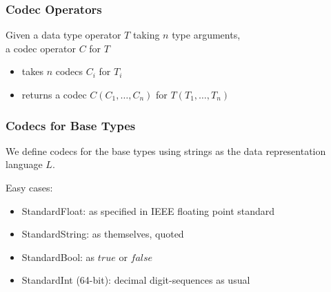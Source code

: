 \begin{frame}\frametitle{Codec Operators}
Given a data type operator $T$ taking $n$ type arguments,\\
a codec operator $C$ for $T$
\begin{itemize}
 \item takes $n$ codecs $C_i$ for $T_i$
 \item returns a codec $C(C_1,\ldots,C_n)$ for $T(T_1,\ldots,T_n)$
\end{itemize}
\end{frame}

%

\begin{frame}\frametitle{Codecs for Base Types}
We define codecs for the base types using strings as the data representation language $L$.

Easy cases:
\begin{itemize}
\item StandardFloat: as specified in IEEE floating point standard
\item StandardString: as themselves, quoted
\item StandardBool: as $true$ or $false$
\item StandardInt (64-bit): decimal digit-sequences as usual
\end{itemize}
\end{frame}


